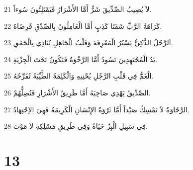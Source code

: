 \par 21 لاَ يُصِيبُ الصِّدِّيقَ شَرٌّ أَمَّا الأَشْرَارُ فَيَمْتَلِئُونَ سُوءاً.
\par 22 كَرَاهَةُ الرَّبِّ شَفَتَا كَذِبٍ أَمَّا الْعَامِلُونَ بِالصِّدْقِ فَرِضَاهُ.
\par 23 اَلرَّجُلُ الذَّكِيُّ يَسْتُرُ الْمَعْرِفَةَ وَقَلْبُ الْجَاهِلِ يُنَادِي بِالْحَمَقِ.
\par 24 يَدُ الْمُجْتَهِدِينَ تَسُودُ أَمَّا الرَّخْوَةُ فَتَكُونُ تَحْتَ الْجِزْيَةِ.
\par 25 الْغَمُّ فِي قَلْبِ الرَّجُلِ يُحْنِيهِ وَالْكَلِمَةُ الطَّيِّبَةُ تُفَرِّحُهُ.
\par 26 الصِّدِّيقُ يَهْدِي صَاحِبَهُ أَمَّا طَرِيقُ الأَشْرَارِ فَتُضِلُّهُمْ.
\par 27 الرَّخَاوَةُ لاَ تَمْسِكُ صَيْداً أَمَّا ثَرْوَةُ الإِنْسَانِ الْكَرِيمَةُ فَهِيَ الاِجْتِهَادُ.
\par 28 فِي سَبِيلِ الْبِرِّ حَيَاةٌ وَفِي طَرِيقِ مَسْلِكِهِ لاَ مَوْتَ.

\chapter{13}

